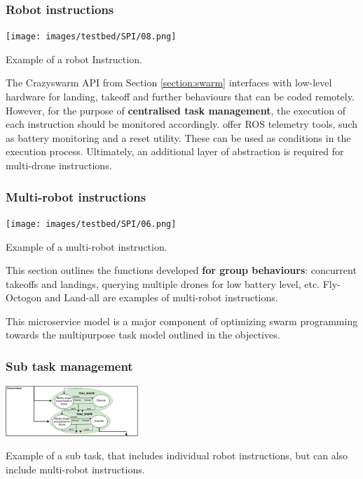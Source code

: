  

\subsubsection{Robot instructions}

\begin{marginfigure}%
  \texttt{[image: images/testbed/SPI/08.png]}
  \caption{Example of a robot Instruction.}
\end{marginfigure}

The Crazyswarm API from Section \ref{section:swarm} interfaces with low-level hardware for landing, takeoff and further behaviours that can be coded remotely. However, for the purpose of \textbf{centralised task management}, the execution of each instruction should be monitored accordingly. {} \cite{hönig_ayanian_2020} offer ROS telemetry tools, such as battery monitoring and a reset utility. These can be used as conditions in the execution process. 
Ultimately, an additional layer of abstraction is required for multi-drone instructions. 



\subsubsection{Multi-robot instructions}

\begin{marginfigure}%
    \raggedright
    \texttt{[image: images/testbed/SPI/06.png]}
    \caption{Example of a multi-robot instruction.}
\end{marginfigure}%

This section outlines the functions developed \textbf{for group behaviours}: concurrent takeoffs and landings, querying multiple drones for low battery level, etc.  Fly-Octogon and Land-all are examples of multi-robot instructions.

This microservice model is a major component of optimizing swarm programming towards the multipurpose task model outlined in the objectives.

\subsubsection{Sub task management}
\begin{marginfigure}%
    \includegraphics[width=5cm]{images/testbed/SPI/traj_shape_simultaneous.png}
    \caption{Example of a sub task, that includes individual robot instructions, but can also include multi-robot instructions.}\label{diagram:hli_concept}
\end{marginfigure}%

